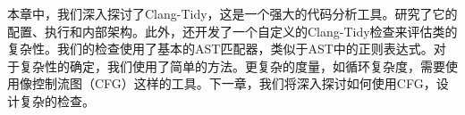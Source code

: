 本章中，我们深入探讨了Clang-Tidy，这是一个强大的代码分析工具。研究了它的配置、执行和内部架构。此外，还开发了一个自定义的Clang-Tidy检查来评估类的复杂性。我们的检查使用了基本的AST匹配器，类似于AST中的正则表达式。对于复杂性的确定，我们使用了简单的方法。更复杂的度量，如循环复杂度，需要使用像控制流图（CFG）这样的工具。下一章，我们将深入探讨如何使用CFG，设计复杂的检查。

